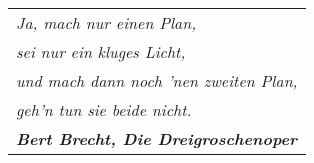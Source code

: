 \documentclass[11pt]{article}
\begin{document}
{\centering
  \begin{minipage}{10cm}
    \begin{tabular}[t]{l}
    \em
    Ja, mach nur einen Plan, 
    \\
    \emph{sei nur ein kluges Licht, }
    \\ 
    \emph{und mach dann noch 'nen zweiten Plan, }
    \\
    \emph{geh'n tun sie beide nicht.}
    \\
    \textbf{\em Bert Brecht, Die Dreigroschenoper}
\end{tabular}
  \end{minipage}}






%

%








%
%
\end{document}
